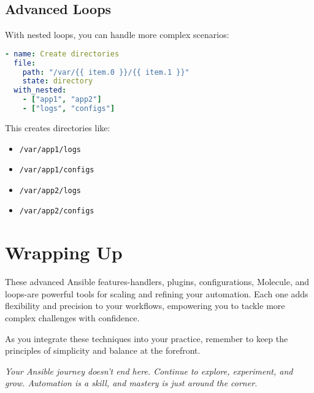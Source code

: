 \subsection{Advanced Loops}

With nested loops, you can handle more complex scenarios:
\begin{lstlisting}[language=yaml, caption=Nested Loops Example]
- name: Create directories
  file:
    path: "/var/{{ item.0 }}/{{ item.1 }}"
    state: directory
  with_nested:
    - ["app1", "app2"]
    - ["logs", "configs"]
\end{lstlisting}

This creates directories like:
\begin{itemize}
    \item \texttt{/var/app1/logs}
    \item \texttt{/var/app1/configs}
    \item \texttt{/var/app2/logs}
    \item \texttt{/var/app2/configs}
\end{itemize}


\section{Wrapping Up}

These advanced Ansible features-handlers, plugins, configurations, Molecule, and loops-are powerful tools for scaling and refining your automation. Each one adds flexibility and precision to your workflows, empowering you to tackle more complex challenges with confidence.

As you integrate these techniques into your practice, remember to keep the principles of simplicity and balance at the forefront.

\vspace{1em}

\textit{Your Ansible journey doesn't end here. Continue to explore, experiment, and grow. Automation is a skill, and mastery is just around the corner.}
